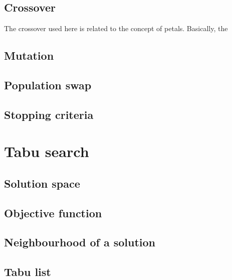 \documentclass{article} %
\begin{document}
\subsection{Crossover}

The crossover used here is related to the concept of petals. Basically, the

\subsection{Mutation}



\subsection{Population swap}



\subsection{Stopping criteria}



\section{Tabu search}
\label{tabu_search}

\subsection{Solution space}



\subsection{Objective function}



\subsection{Neighbourhood of a solution}



\subsection{Tabu list}
\end{document}

